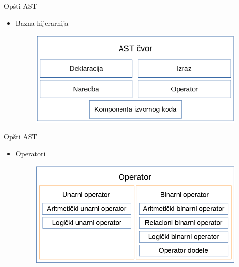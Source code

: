 \documentclass{beamer}
\begin{document}
\begin{frame}{Op\v{s}ti AST}
    \begin{itemize}
        \item Bazna hijerarhija
        \begin{figure}[h!]
            \centering
            \includegraphics[scale=0.6]{images/nodes.PNG}
        \end{figure}
    \end{itemize}
\end{frame}

\begin{frame}{Op\v{s}ti AST}
    \begin{itemize}
        \item Operatori
        \begin{figure}[h!]
            \centering
            \includegraphics[scale=0.5]{images/operator_nodes.png}
        \end{figure}
    \end{itemize}
\end{frame}
\end{document}
